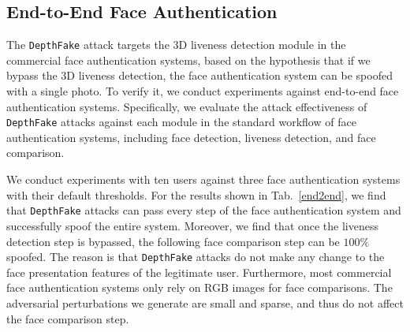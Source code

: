 \subsection{End-to-End Face Authentication}

The \texttt{DepthFake} attack targets the 3D liveness detection module in the commercial face authentication systems, based on the hypothesis that if we bypass the 3D liveness detection, the face authentication system can be spoofed with a single photo.
To verify it, we conduct experiments against end-to-end face authentication systems. Specifically, we evaluate the attack effectiveness of \texttt{DepthFake} attacks against each module in the standard workflow of face authentication systems, including face detection, liveness detection, and face comparison. 

We conduct experiments with ten users against three face authentication systems with their default thresholds.
For the results shown in Tab.~\ref{end2end}, we find that \texttt{DepthFake} attacks can pass every step of the face authentication system and successfully spoof the entire system. Moreover, we find that once the liveness detection step is bypassed, the following face comparison step can be $100\%$ spoofed. The reason is that \texttt{DepthFake} attacks do not make any change to the face presentation features of the legitimate user. Furthermore, most commercial face authentication systems only rely on RGB images for face comparisons. The adversarial perturbations we generate are small and sparse, and thus do not affect the face comparison step.




%
%
